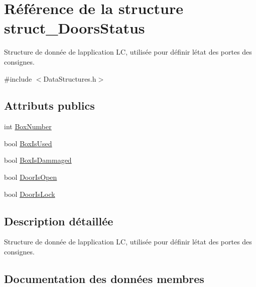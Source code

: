 \hypertarget{structstruct___doors_status}{}\section{Référence de la structure struct\+\_\+\+Doors\+Status}
\label{structstruct___doors_status}


Structure de donnée de l\textquotesingle{}application L\+C, utilisée pour définir l\textquotesingle{}état des portes des consignes.  




{\ttfamily \#include $<$Data\+Structures.\+h$>$}

\subsection*{Attributs publics}
\begin{DoxyCompactItemize}
\item 
int \hyperlink{structstruct___doors_status_a139f38ebf1300f853d902b22520eda71}{Box\+Number}
\item 
bool \hyperlink{structstruct___doors_status_a056929554c348f990417d17b1b66bd8d}{Box\+Is\+Used}
\item 
bool \hyperlink{structstruct___doors_status_a2663f0fa457393e07c10ba1c9843d0ee}{Box\+Is\+Dammaged}
\item 
bool \hyperlink{structstruct___doors_status_a6c7607cfa6b784ec4558eff3cb48aeaa}{Door\+Is\+Open}
\item 
bool \hyperlink{structstruct___doors_status_a878ee17f7494eb2ada44dd8fc126f271}{Door\+Is\+Lock}
\end{DoxyCompactItemize}


\subsection{Description détaillée}
Structure de donnée de l\textquotesingle{}application L\+C, utilisée pour définir l\textquotesingle{}état des portes des consignes. 

\subsection{Documentation des données membres}
\hypertarget{structstruct___doors_status_a2663f0fa457393e07c10ba1c9843d0ee}{}
